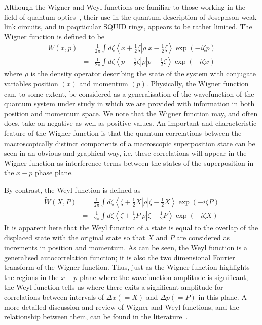 \documentclass[12pt,a4paper,superscriptaddress,showpacs,floatfix,pra]{revtex4-2}
\begin{document}
Although the Wigner  and Weyl functions are familiar  to those working
in             the             field            of             quantum
optics~\cite{Wigner1932,balazs1984,ChountasisV1998}, their  use in the
quantum description of Josephson weak link circuits, and in paqrticular
SQUID  rings, appears  to be  rather limited.  The Wigner  function is
defined to be
\begin{eqnarray*}
W\left( x,p\right) &=&\frac{1}{2\pi }\int d\zeta \left\langle x+\frac{1}{2}
\zeta \right\vert \rho \left\vert x-\frac{1}{2}\zeta \right\rangle \exp
\left( -i\zeta p\right) \\
&=&\frac{1}{2\pi }\int d\zeta \left\langle p+\frac{1}{2}\zeta \right\vert
\rho \left\vert p-\frac{1}{2}\zeta \right\rangle \exp \left( -i\zeta x\right)
\end{eqnarray*}
where  $\rho $ is  the density  operator describing  the state  of the
system  with  conjugate  variables  position $\left(  x\right)  $  and
momentum $\left(  p\right) $. Physically, the Wigner  function can, to
some extent, be considered as  a generalisation of the wavefunction of
the  quantum  system  under  study  in  which  we  are  provided  with
information  in both  position and  momentum space.  We note  that the
Wigner  function may,  and often  does, take  on negative  as  well as
positive values. An important and characteristic feature of the Wigner
function is that the  quantum correlations between the macroscopically
distinct components  of a macroscopic superposition state  can be seen
in an obvious  and graphical way, i.e. these  correlations will appear
in the Wigner function as interference terms between the states of the
superposition in the $x-p$ phase plane.

By contrast, the Weyl function is defined as 
\begin{eqnarray*}
\tilde{W}\left( X,P\right) &=&\frac{1}{2\pi }\int d\zeta \left\langle \zeta
+ \frac{1}{2}X\right\vert \rho \left\vert \zeta -\frac{1}{2}X\right\rangle
\exp \left( -i\zeta P\right) \\
&=&\frac{1}{2\pi }\int d\zeta \left\langle \zeta +\frac{1}{2}P\right\vert
\rho \left\vert \zeta -\frac{1}{2}P\right\rangle \exp \left( -i\zeta X\right)
\end{eqnarray*}
It is apparent here that the Weyl  function of a state is equal to the
overlap of the displaced state with the original state so that $X$ and
$P$ are considered  as increments in position and  momentum. As can be
seen, the Weyl function  is a generalised autocorrelation function; it
is  also   the  two  dimensional  Fourier  transform   of  the  Wigner
function. Thus, just as the  Wigner function highlights the regions in
the $x-p$  plane where the wavefunction amplitude  is significant, the
Weyl function tells  us where there exits a  significant amplitude for
correlations  between intervals  of  $\Delta x\left(  =X\right) $  and
$\Delta p\left( =P\right) $ in  this plane. A more detailed discussion
and review of Wigner and  Weyl functions, and the relationship between
them,          can          be          found          in          the
literature~\cite{ChountasisV1998,WolfgangS2001}.
\end{document}
